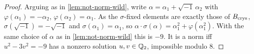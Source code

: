 \begin{proof}
  Arguing as in \cref{lem:not-norm-wild}, write \(\alpha = \alpha_1 +
  \sqrt{-1}\,\alpha_2\) with \(\varphi(\alpha_1) = -\alpha_2\),
  \(\varphi(\alpha_2) = \alpha_1\). As the \(\sigma\)-fixed elements are exactly
  those of \(B_{\mathrm{crys}}\), \(\sigma(\sqrt{-1}) = -\sqrt{-1}\) and
  \(\sigma(\alpha_1) = \alpha_1\), so \(\alpha \cdot \sigma(\alpha) = \alpha_1^2
  + \varphi(\alpha_1^2)\). With the same choice of \(\alpha\) as in
  \cref{lem:not-norm-wild} this is \(-9\). It is a norm iff \(u^2 - 3v^2 = -9\)
  has a nonzero solution \(u, v \in \mathbb{Q}_2\), impossible modulo \(8\).
\end{proof}
